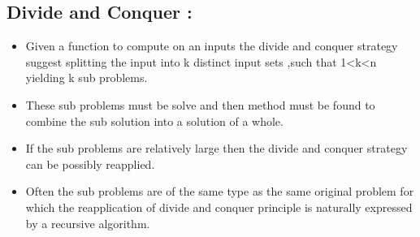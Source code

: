\documentclass{article}
\begin{document}
\subsection{Divide and Conquer : }
	\begin{itemize}
		\item Given a function to compute on an inputs the divide and conquer strategy suggest splitting the input into k distinct input sets ,such that 1<k<n yielding k sub problems.
		\item These sub problems must be solve and then method must be found to combine the sub solution into a solution of a whole.
		\item If the sub problems are relatively large then the divide and conquer strategy can be possibly reapplied.
		\item Often the sub problems are of the same type as the same original problem for which the reapplication of divide and conquer principle is naturally expressed by a recursive algorithm.
\end{itemize}
\end{document}
